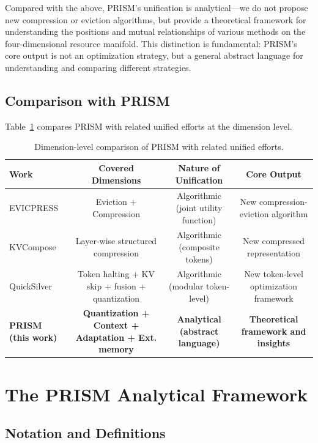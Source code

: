 \documentclass[11pt,a4paper]{article}
\theoremstyle{plain}
\theoremstyle{definition}
\begin{document}
Compared with the above, PRISM's unification is analytical---we do not propose new compression or eviction algorithms, but provide a theoretical framework for understanding the positions and mutual relationships of various methods on the four-dimensional resource manifold. This distinction is fundamental: PRISM's core output is not an optimization strategy, but a general abstract language for understanding and comparing different strategies.

\subsection{Comparison with PRISM}

Table~\ref{tab:comparison} compares PRISM with related unified efforts at the dimension level.

\begin{table}[htbp]
\centering
\caption{Dimension-level comparison of PRISM with related unified efforts.}
\label{tab:comparison}
\begin{tabular}{lccc}
\toprule
\textbf{Work} & \textbf{Covered Dimensions} & \textbf{Nature of Unification} & \textbf{Core Output} \\
\midrule
EVICPRESS & Eviction + Compression & Algorithmic (joint utility function) & New compression-eviction algorithm \\
KVCompose & Layer-wise structured compression & Algorithmic (composite tokens) & New compressed representation \\
QuickSilver & Token halting + KV skip + fusion + quantization & Algorithmic (modular token-level) & New token-level optimization framework \\
\textbf{PRISM (this work)} & \textbf{Quantization + Context + Adaptation + Ext. memory} & \textbf{Analytical (abstract language)} & \textbf{Theoretical framework and insights} \\
\bottomrule
\end{tabular}
\end{table}

\section{The PRISM Analytical Framework}

\subsection{Notation and Definitions}
\end{document}
